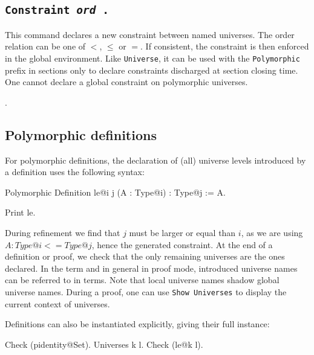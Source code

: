 \subsection{\tt Constraint {\ident} {\textit{ord}} {\ident}.
  \label{ConstraintCmd}}

This command declares a new constraint between named universes.
The order relation can be one of $<$, $\le$ or $=$. If consistent, 
the constraint is then enforced in the global environment. Like
\texttt{Universe}, it can be used with the \texttt{Polymorphic} prefix
in sections only to declare constraints discharged at section closing time.
One cannot declare a global constraint on polymorphic universes.

\begin{ErrMsgs}
\item {}.
\item {}
\end{ErrMsgs}

\subsection{Polymorphic definitions}
For polymorphic definitions, the declaration of (all) universe levels
introduced by a definition uses the following syntax:

\begin{coq_example*}
Polymorphic Definition le@{i j} (A : Type@{i}) : Type@{j} := A.
\end{coq_example*}
\begin{coq_example}
Print le.
\end{coq_example}

During refinement we find that $j$ must be larger or equal than $i$, as
we are using $A : Type@{i} <= Type@{j}$, hence the generated
constraint. At the end of a definition or proof, we check that the only
remaining universes are the ones declared. In the term and in general in
proof mode, introduced universe names can be referred to in
terms. Note that local universe names shadow global universe names.
During a proof, one can use \texttt{Show Universes} to display
the current context of universes.

Definitions can also be instantiated explicitly, giving their full instance:
\begin{coq_example}
Check (pidentity@{Set}).
Universes k l.
Check (le@{k l}).
\end{coq_example}

